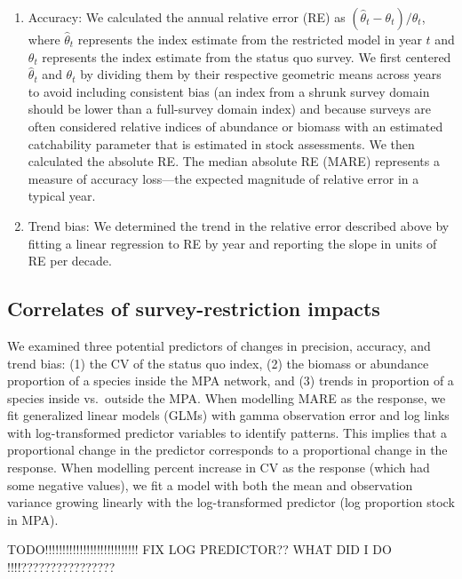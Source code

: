 \documentclass[12pt]{article}
\begin{document}
\begin{spacing}{1.4}
\begin{enumerate}
    \item Accuracy: We calculated the annual relative error (RE) as $(\hat{\theta}_t - \theta_t) / \theta_t$, where $\hat{\theta}_t$ represents the index estimate from the restricted model in year $t$ and $\theta_t$ represents the index estimate from the status quo survey. We first centered $\hat{\theta}_t$ and $\theta_t$ by dividing them by their respective geometric means across years to avoid including consistent bias (an index from a shrunk survey domain should be lower than a full-survey domain index) and because surveys are often considered relative indices of abundance or biomass with an estimated catchability parameter that is estimated in stock assessments. We then calculated the absolute RE. The median absolute RE (MARE) represents a measure of accuracy loss---the expected magnitude of relative error in a typical year.

    \item Trend bias: We determined the trend in the relative error described above by fitting a linear regression to RE by year and reporting the slope in units of RE per decade.

\end{enumerate}

\subsection*{Correlates of survey-restriction impacts}

We examined three potential predictors of changes in precision, accuracy, and trend bias:
(1) the CV of the status quo index, (2) the biomass or abundance proportion of a species inside the MPA network, and (3) trends in proportion of a species inside vs.\ outside the MPA.
When modelling MARE as the response, we fit generalized linear models (GLMs) with gamma observation error and log links with log-transformed predictor variables to identify patterns.
This implies that a proportional change in the predictor corresponds to a proportional change in the response.
When modelling percent increase in CV as the response (which had some negative values), we fit a model with both the mean and observation variance growing linearly with the log-transformed predictor (log proportion stock in MPA).


TODO!!!!!!!!!!!!!!!!!!!!!!!!!!! FIX LOG PREDICTOR?? WHAT DID I DO !!!!????????????????


\end{spacing}
\end{document}
